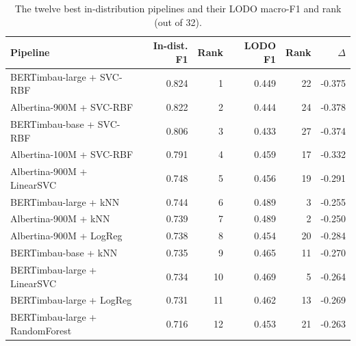 \begin{table}[t]
\centering
\small
\caption{The twelve best in-distribution pipelines and their LODO macro-F1 and rank (out of 32).}
\label{tab:lodo-vs-indist-pipelines}
\begin{tabular}{lrrrrr}
\toprule
Pipeline & In-dist. F1 & Rank & LODO F1 & Rank & $\Delta$ \\
\midrule
BERTimbau-large + SVC-RBF & 0.824 & 1 & 0.449 & 22 & -0.375 \\
Albertina-900M + SVC-RBF & 0.822 & 2 & 0.444 & 24 & -0.378 \\
BERTimbau-base + SVC-RBF & 0.806 & 3 & 0.433 & 27 & -0.374 \\
Albertina-100M + SVC-RBF & 0.791 & 4 & 0.459 & 17 & -0.332 \\
Albertina-900M + LinearSVC & 0.748 & 5 & 0.456 & 19 & -0.291 \\
BERTimbau-large + kNN & 0.744 & 6 & 0.489 & 3 & -0.255 \\
Albertina-900M + kNN & 0.739 & 7 & 0.489 & 2 & -0.250 \\
Albertina-900M + LogReg & 0.738 & 8 & 0.454 & 20 & -0.284 \\
BERTimbau-base + kNN & 0.735 & 9 & 0.465 & 11 & -0.270 \\
BERTimbau-large + LinearSVC & 0.734 & 10 & 0.469 & 5 & -0.264 \\
BERTimbau-large + LogReg & 0.731 & 11 & 0.462 & 13 & -0.269 \\
BERTimbau-large + RandomForest & 0.716 & 12 & 0.453 & 21 & -0.263 \\
\bottomrule
\end{tabular}
\end{table}
